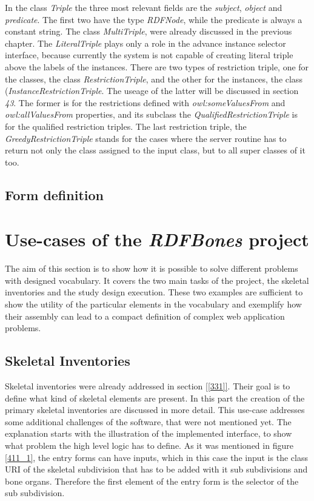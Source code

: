 In the class \textit{Triple} the three most relevant fields are the \textit{subject}, \textit{object} and \textit{predicate}. The first two have the type \textit{RDFNode}, while the predicate is always a constant string. The class \textit{MultiTriple}, were already discussed in the previous chapter. The \textit{LiteralTriple} plays only a role in the advance instance selector interface, because currently the system is not capable of creating literal triple above the labels of the instances. There are two types of restriction triple, one for the classes, the class \textit{RestrictionTriple}, and the other for the instances, the class (\textit{InstanceRestrictionTriple}. The useage of the latter will be discussed in section \textit{43}. The former is for the restrictions defined with \textit{owl:someValuesFrom} and \textit{owl:allValuesFrom} properties, and its subclass the \textit{QualifiedRestrictionTriple} is for the qualified restriction triples. The last restriction triple, the \textit{GreedyRestrictionTriple} stands for the cases where the server routine has to return not only the class assigned to the input class, but to all super classes of it too.

\subsection{Form definition}



\section{Use-cases of the \textit{RDFBones} project}

The aim of this section is to show how it is possible to solve different problems with designed vocabulary. It covers the two main tasks of the project, the skeletal inventories and the study design execution. These two examples are sufficient to show the utility of the particular elements in the vocabulary and exemplify how their assembly can lead to a compact definition of complex web application problems.

\subsection{Skeletal Inventories}

Skeletal inventories were already addressed in section \ref{[331]}. Their goal is to define what kind of skeletal elements are present. In this part the creation of the primary skeletal inventories are discussed in more detail. This use-case addresses some additional challenges of the software, that were not mentioned yet.
The explanation starts with the illustration of the implemented interface, to show what problem the high level logic has to define. As it was mentioned in figure \ref{411_1}, the entry forms can have inputs, which in this case the input is the class URI of the skeletal subdivision that has to be added with it sub subdivisions and bone organs. Therefore the first element of the entry form is the selector of the sub subdivision.


